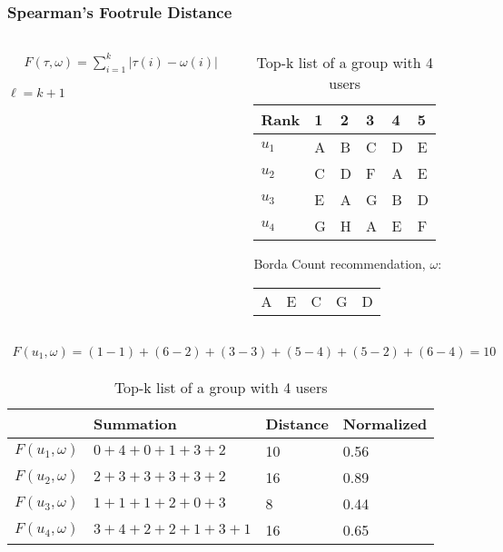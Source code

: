 \begin{frame}[t]
\frametitle{Spearman's Footrule Distance}
\begin{columns}
\begin{column}{0.45\textwidth}
\begin{align*}
F(\tau, \omega) = \sum_{i=1}^{k} | \tau (i) - \omega (i) |
\end{align*}

$\ell = k + 1$

\end{column}
\begin{column}{0.55\textwidth}
\small
\vspace{-0.5cm}
\begin{table}
\captionsetup{font=footnotesize}
\begin{tabular}{|l|lllll|} \hline
Rank  & 1 & 2 & 3 & 4 & 5 \\\hline
$u_1$ & A & B & C & D & E \\
$u_2$ & C & D & F & A & E \\
$u_3$ & E & A & G & B & D \\
$u_4$ & G & H & A & E & F\\\hline
\end{tabular}
\caption{Top-k list of a group with 4 users}
\end{table}
\normalsize
Borda Count recommendation, $\omega$: \\
\begin{table}
\centering
\begin{tabular}{lllll}
 A & E & C & G & D
\end{tabular}
\end{table}
\end{column}
\end{columns}
\small
\begin{align*}
F(u_1, \omega) = (1-1) + (6-2) + (3-3) + (5-4) + (5-2) + (6-4) = 10
\end{align*}
\normalsize

\begin{table}
\captionsetup{font=footnotesize}
\begin{tabular}{|l|l|l|l|} \hline
				 & Summation 			  & Distance & Normalized \\\hline
$F(u_1, \omega)$ & $0 + 4 + 0 + 1 + 3 + 2$ & 10		 & 0.56 \\
$F(u_2, \omega)$ & $2 + 3 + 3 + 3 + 3 + 2$ & 16		 & 0.89 \\
$F(u_3, \omega)$ & $1 + 1 + 1 + 2 + 0 + 3$ & 8  	 & 0.44 \\
$F(u_4, \omega)$ & $3 + 4 + 2 + 2 + 1 + 3 + 1$ & 16 	 & 0.65 \\\hline
\end{tabular}
\caption{Top-k list of a group with 4 users}
\end{table}
\end{frame}

%
%
%
